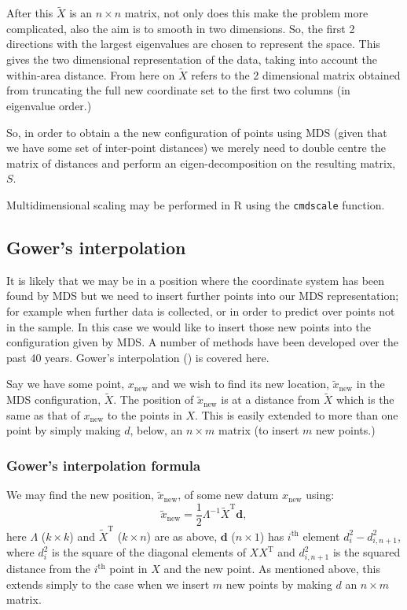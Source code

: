 \documentclass[a4paper,10pt]{article}
\newcommand{\tr}[1]{#1^{\text{T}}}
\newcommand{\cross}{\times}
\begin{document}
After this $\tilde{X}$ is an $n \cross n$ matrix, not only does this make the problem more complicated, also the aim is to smooth in two dimensions. So, the first 2 directions with the largest eigenvalues are chosen to represent the space. This gives the two dimensional representation of the data, taking into account the within-area distance. From here on $\tilde{X}$ refers to the 2 dimensional matrix obtained from truncating the full new coordinate set to the first two columns (in eigenvalue order.)

So, in order to obtain a the new configuration of points using MDS (given that we have some set of inter-point distances) we merely need to double centre the matrix of distances and perform an eigen-decomposition on the resulting matrix, $S$. 

Multidimensional scaling may be performed in \textsf{R} using the \texttt{cmdscale} function. 

\subsection{Gower's interpolation} 

It is likely that we may be in a position where the coordinate system has been found by MDS but we need to insert further points into our MDS representation; for example when further data is collected, or in order to predict over points not in the sample. In this case we would like to insert those new points into the configuration given by MDS. A number of methods have been developed over the past 40 years. Gower's interpolation (\cite{gower1968}) is covered here.

Say we have some point, $x_{\text{new}}$ and we wish to find its new location, $\tilde{x}_{\text{new}}$ in the MDS configuration, $\tilde{X}$. The position of $\tilde{x}_{\text{new}}$ is at a distance from $\tilde{X}$ which is the same as that of $x_{\text{new}}$ to the points in $X$. This is easily extended to more than one point by simply making $d$, below, an $n \cross m$ matrix (to insert $m$ new points.)


\subsubsection{Gower's interpolation formula}

We may find the new position, $\tilde{x}_{\text{new}}$, of some new datum $x_{\text{new}}$ using:
\begin{equation}
\tilde{x}_{\text{new}} = \frac{1}{2} \Lambda^{-1} \tr{\tilde{X}} \mathbf{d},
\label{gower}
\end{equation}
here $\Lambda$ ($k \cross k$) and $\tr{\tilde{X}}$ ($k \cross n$) are as above, $\mathbf{d}$ ($n \cross 1$) has $i^\text{th}$ element $d^2_i-d^2_{i,n+1}$, where $d^2_i$ is the square of the diagonal elements of $X\tr{X}$ and $d^2_{i,n+1}$ is the squared distance from the $i^\text{th}$ point in $X$ and the new point. As mentioned above, this extends simply to the case when we insert $m$ new points by making $d$ an $n \cross m$ matrix.
\end{document}
